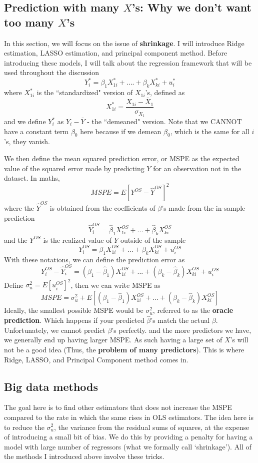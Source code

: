 \documentclass[12pt]{article}
\theoremstyle{definition}
\theoremstyle{property}
\theoremstyle{assumption}
\theoremstyle{example}
\theoremstyle{comment}
\begin{document}
\subsection{Prediction with many $X$'s: Why we don't want too many $X$'s}
In this section, we will focus on the issue of \textbf{shrinkage}. I will introduce Ridge estimation, LASSO estimation, and principal component method. Before introducing these models, I will talk about the regression framework that will be used throughout the discussion
\[
Y_{i}^*=\beta_1X_{1i}^*+....+\beta_kX_{ki}^*+u_i^*
\]
where $X_{1i}^*$ is the ``standardized" version of $X_{1i}$'s, defined as
\[
X_{1i}^*=\frac{X_{1i}-\bar{X}_1}{\sigma_{X_{1}}}
\]
and we define $Y^*_i$ as $Y_{i}-\bar{Y}$ - the ``demeaned" version. Note that we CANNOT have a constant term $\beta_0$ here because if we demean $\beta_0$, which is the same for all $i$'s, they vanish. 
\par\medskip
We then define the mean squared prediction error, or MSPE as the expected value of the squared error made by predicting $Y$ for an observation not in the dataset. In maths, 
\[
MSPE= E[Y^{OS}-\hat{Y}^{OS}]^2
\]
where the $\hat{Y}^{OS}$ is obtained from the coefficients of $\beta$'s made from the in-sample prediction
\[
\hat{Y}_i^{OS}=\hat{\beta}_1X_{1i}^{OS}+ ... +\hat{\beta}_kX_{ki}^{OS}
\]
and the $Y^{OS}$ is the realized value of $Y$ outside of the sample
\[
Y_i^{OS}=\beta_1X_{1i}^{OS}+ ... +\beta_kX_{ki}^{OS}+u_i^{OS}
\]
With these notations, we can define the prediction error as
\[
Y_i^{OS}-\hat{Y}_i^{OS}=(\beta_1-\hat{\beta}_1)X^{OS}_{1i}+...+(\beta_k-\hat{\beta}_k)X^{OS}_{ki}+u_i^{OS}
\]
Define $\sigma_u^2=E[u_i^{OS}]^2$, then we can write MSPE as
\[
MSPE=\sigma_u^2+ E[(\beta_1-\hat{\beta}_1)X^{OS}_{1i}+...+(\beta_k-\hat{\beta}_k)X^{OS}_{ki}]
\]
Ideally, the smallest possible MSPE would be $\sigma_u^2$, referred to as the \textbf{oracle prediction}. Which happens if your predicted $\hat{\beta}$'s match the actual $\beta$. Unfortunately, we cannot predict $\beta$'s perfectly. and the more predictors we have, we generally end up having larger MSPE. As such having a large set of $X$'s will not be a good idea (Thus, the \textbf{problem of many predictors}). This is where Ridge, LASSO, and Principal Component method comes in.

\subsection{Big data methods}
The goal here is to find other estimators that does not increase the MSPE compared to the rate in which the same rises in OLS estimators. The idea here is to reduce the $\sigma_u^2$, the variance from the residual sums of squares, at the expense of introducing a small bit of bias. We do this by providing a penalty for having a model with large number of regressors (what we formally call `shrinkage'). All of the methods I introduced above involve these tricks. 
\end{document}
